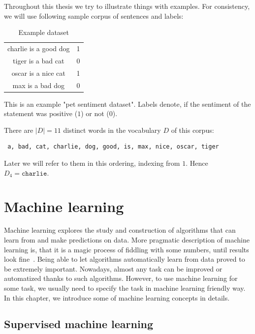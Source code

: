     Throughout this thesis we try to illustrate things with examples. 
    For consistency, we will use following sample corpus of sentences and labels:
    
    \begin{table}[h]
        \centering
        \begin{tabular}{c|c}
        \hline
            charlie is a good dog & 1 \\
            tiger is a bad cat & 0 \\
            oscar is a nice cat & 1 \\
            max is a bad dog & 0 \\
        \end{tabular}
        \caption{Example dataset}
        \label{tab:example:dataset}

    \end{table}
    
    This is an example "pet sentiment dataset". Labels denote, if the sentiment of the statement was positive ($1$) or not ($0$). 

    There are $|D|=11$ distinct words in the vocabulary $D$ of this corpus: 
    \begin{verbatim} a, bad, cat, charlie, dog, good, is, max, nice, oscar, tiger \end{verbatim}
    
    Later we will refer to them in this ordering, indexing from $1$. 
    Hence $D_4=\mathtt{charlie}$.


\section{Machine learning}
    
    Machine learning explores the study and construction of algorithms that can learn from and make predictions on data.
    More pragmatic description of machine learning is, that it is a magic process of fiddling with some numbers, until results look fine~\cite{boza2018}. 
    Being able to let algorithms automatically learn from data proved to be extremely important.
    Nowadays, almost any task can be improved or automatized thanks to such algorithms. 
    However, to use machine learning for some task, we usually need to specify the task in machine learning friendly way.    
    In this chapter, we introduce some of machine learning concepts in details.


    \subsection{Supervised machine learning}
    
